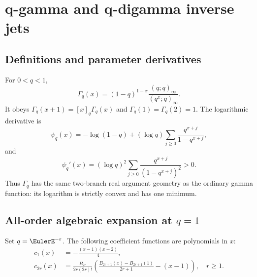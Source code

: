\documentclass[11pt,letterpaper,oneside,openany]{book}
\theoremstyle{definition}
\theoremstyle{remark}
\begin{document}
\chapter{q-gamma and q-digamma inverse jets}

\section{Definitions and parameter derivatives}
For \(0<q<1\),
\begin{equation}
 \Gamma_q(x)=(1-q)^{1-x}
 \frac{(q;q)_\infty}{(q^x;q)_\infty}.
 \label{eq:qgamma-def}
\end{equation}
It obeys
\(
 \Gamma_q(x+1)=[x]_q\Gamma_q(x)
\)
and \(\Gamma_q(1)=\Gamma_q(2)=1\).  The logarithmic derivative is
\begin{equation}
 \psi_q(x)=-\log(1-q)+(\log q)
 \sum_{j\ge0}\frac{q^{x+j}}{1-q^{x+j}},
 \label{eq:qdigamma}
\end{equation}
and
\begin{equation}
 \psi_q'(x)=(\log q)^2\sum_{j\ge0}
 \frac{q^{x+j}}{(1-q^{x+j})^2}>0.
 \label{eq:qtrigamma-positive}
\end{equation}
Thus \(\Gamma_q\) has the same two-branch real argument geometry as the ordinary
gamma function: its logarithm is strictly convex and has one minimum.

\section{All-order algebraic expansion at \(q=1\)}
Set \(q=\EulerE^{-\varepsilon}\).  The following coefficient functions are
polynomials in \(x\):
\begin{align}
 c_1(x)&=-\frac{(x-1)(x-2)}4, \label{eq:qgamma-c1}\\
 c_{2r}(x)&=
 \frac{B_{2r}}{2r(2r)!}
 \left(
 \frac{B_{2r+1}(x)-B_{2r+1}(1)}{2r+1}-(x-1)
 \right),\quad r\ge1. \label{eq:qgamma-c2r}
\end{align}
\end{document}
